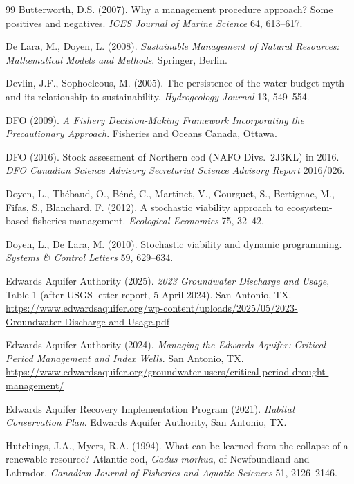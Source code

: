 \documentclass[11pt,a4paper]{article}
\theoremstyle{plain}
\theoremstyle{definition}
\theoremstyle{remark}
\begin{document}
\begin{thebibliography}{99}
 Butterworth, D.S. (2007). Why a management procedure approach? Some positives and negatives. \emph{ICES Journal of Marine Science} 64, 613--617.

 De Lara, M., Doyen, L. (2008). \emph{Sustainable Management of Natural Resources: Mathematical Models and Methods}. Springer, Berlin.

 Devlin, J.F., Sophocleous, M. (2005). The persistence of the water budget myth and its relationship to sustainability. \emph{Hydrogeology Journal} 13, 549--554.

 DFO (2009). \emph{A Fishery Decision-Making Framework Incorporating the Precautionary Approach}. Fisheries and Oceans Canada, Ottawa.

 DFO (2016). Stock assessment of Northern cod (NAFO Divs.\ 2J3KL) in 2016. \emph{DFO Canadian Science Advisory Secretariat Science Advisory Report} 2016/026.

 Doyen, L., Th\'ebaud, O., B\'en\'e, C., Martinet, V., Gourguet, S., Bertignac, M., Fifas, S., Blanchard, F. (2012). A stochastic viability approach to ecosystem-based fisheries management. \emph{Ecological Economics} 75, 32--42.

 Doyen, L., De Lara, M. (2010). Stochastic viability and dynamic programming. \emph{Systems \& Control Letters} 59, 629--634.

 Edwards Aquifer Authority (2025). \emph{2023 Groundwater Discharge and Usage}, Table 1 (after USGS letter report, 5 April 2024). San Antonio, TX. \url{https://www.edwardsaquifer.org/wp-content/uploads/2025/05/2023-Groundwater-Discharge-and-Usage.pdf}

 Edwards Aquifer Authority (2024). \emph{Managing the Edwards Aquifer: Critical Period Management and Index Wells}. San Antonio, TX. \url{https://www.edwardsaquifer.org/groundwater-users/critical-period-drought-management/}

 Edwards Aquifer Recovery Implementation Program (2021). \emph{Habitat Conservation Plan}. Edwards Aquifer Authority, San Antonio, TX.

 Hutchings, J.A., Myers, R.A. (1994). What can be learned from the collapse of a renewable resource? Atlantic cod, \emph{Gadus morhua}, of Newfoundland and Labrador. \emph{Canadian Journal of Fisheries and Aquatic Sciences} 51, 2126--2146.


\end{thebibliography}
\end{document}
